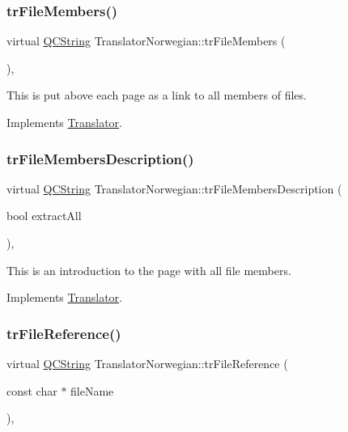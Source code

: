 \subsubsection{\texorpdfstring{trFileMembers()}{trFileMembers()}}
{\footnotesize\ttfamily virtual \mbox{\hyperlink{class_q_c_string}{Q\+C\+String}} Translator\+Norwegian\+::tr\+File\+Members (\begin{DoxyParamCaption}{ }\end{DoxyParamCaption})\hspace{0.3cm}{\ttfamily [inline]}, {\ttfamily [virtual]}}

This is put above each page as a link to all members of files. 

Implements \mbox{\hyperlink{class_translator}{Translator}}.

\mbox{\label{class_translator_norwegian_ae9fe7a382e392c785e94232bb507f9f6}} 
\subsubsection{\texorpdfstring{trFileMembersDescription()}{trFileMembersDescription()}}
{\footnotesize\ttfamily virtual \mbox{\hyperlink{class_q_c_string}{Q\+C\+String}} Translator\+Norwegian\+::tr\+File\+Members\+Description (\begin{DoxyParamCaption}\item[{bool}]{extract\+All }\end{DoxyParamCaption})\hspace{0.3cm}{\ttfamily [inline]}, {\ttfamily [virtual]}}

This is an introduction to the page with all file members. 

Implements \mbox{\hyperlink{class_translator}{Translator}}.

\mbox{\label{class_translator_norwegian_a495c2b1a87aa3714b8e5d9a67a836aed}} 
\subsubsection{\texorpdfstring{trFileReference()}{trFileReference()}}
{\footnotesize\ttfamily virtual \mbox{\hyperlink{class_q_c_string}{Q\+C\+String}} Translator\+Norwegian\+::tr\+File\+Reference (\begin{DoxyParamCaption}\item[{const char $\ast$}]{file\+Name }\end{DoxyParamCaption})\hspace{0.3cm}{\ttfamily [inline]}, {\ttfamily [virtual]}}

